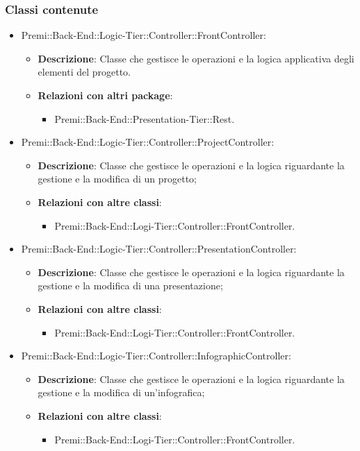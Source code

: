 	\subsubsection*{Classi contenute}
		\begin{itemize}
			\item Premi::Back-End::Logic-Tier::Controller::FrontController:
			\begin{itemize}
				\item \textbf{Descrizione}: Classe che gestisce le operazioni e la logica applicativa degli elementi del progetto.
				\item \textbf{Relazioni con altri package}:
				\begin{itemize}
					\item Premi::Back-End::Presentation-Tier::\gls{Rest}.
				\end{itemize}
			\end{itemize}
			
			\item Premi::Back-End::Logic-Tier::Controller::ProjectController:
			\begin{itemize}
				\item \textbf{Descrizione}: Classe che gestisce le operazioni e la logica riguardante la gestione e la modifica di un progetto;
				\item \textbf{Relazioni con altre classi}:
				\begin{itemize}
					\item Premi::Back-End::Logi-Tier::Controller::FrontController.
				\end{itemize}
			\end{itemize}
			
			\item Premi::Back-End::Logic-Tier::Controller::PresentationController:
			\begin{itemize}
				\item \textbf{Descrizione}: Classe che gestisce le operazioni e la logica riguardante la gestione e la modifica di una presentazione;
				\item \textbf{Relazioni con altre classi}:
				\begin{itemize}
					\item Premi::Back-End::Logi-Tier::Controller::FrontController.
				\end{itemize}
			\end{itemize}
			
			\item Premi::\gls{Back-End}::Logic-Tier::Controller::InfographicController:
			\begin{itemize}
				\item \textbf{Descrizione}: Classe che gestisce le operazioni e la logica riguardante la gestione e la modifica di un'\gls{infografica};
				\item \textbf{Relazioni con altre classi}:
				\begin{itemize}
					\item Premi::Back-End::Logi-Tier::Controller::FrontController.
				\end{itemize}
			\end{itemize}
			

\end{itemize}
